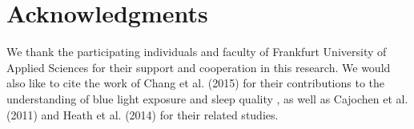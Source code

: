 \documentclass[conference]{IEEEtran}
\begin{document}
\section{Acknowledgments}
We thank the participating individuals and faculty of Frankfurt University of Applied Sciences for their support and cooperation in this research. We would also like to cite the work of Chang et al. (2015) for their contributions to the understanding of blue light exposure and sleep quality \cite{chang2015}, as well as Cajochen et al. (2011) \cite{cajochen2011} and Heath et al. (2014) \cite{heath2014} for their related studies.



\end{document}
